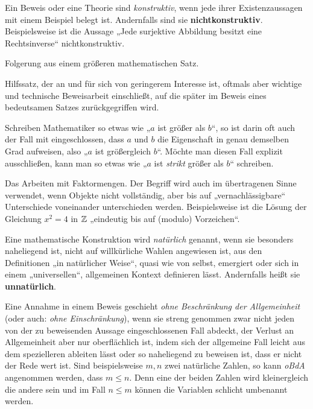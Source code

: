 \begin{description}[labelindent=0pt, leftmargin=0pt]
    \item[Konstruktiv:] Ein Beweis oder eine Theorie sind \emph{konstruktiv}, wenn jede ihrer Existenzaussagen mit einem Beispiel belegt ist. Andernfalls sind sie \textbf{nichtkonstruktiv}. Beispielsweise ist die Aussage „Jede surjektive Abbildung besitzt eine Rechtsinverse“ nichtkonstruktiv.
    
    \item[Korollar:] Folgerung aus einem größeren mathematischen Satz.

    \item[Lemma:] Hilfssatz, der an und für sich von geringerem Interesse ist, oftmals aber wichtige und technische Beweisarbeit einschließt, auf die später im Beweis eines bedeutsamen Satzes zurückgegriffen wird.

    \item[Mathematischer Komparativ:] Schreiben Mathematiker so etwas wie „$a$ ist größer als $b$“, so ist darin oft auch der Fall mit eingeschlossen, dass $a$ und $b$ die Eigenschaft in genau demselben Grad aufweisen, also „$a$ ist größergleich $b$“. Möchte man diesen Fall explizit ausschließen, kann man so etwas wie „$a$ ist \emph{strikt} größer als $b$“ schreiben.
    
    \item[Modulo:]  Das Arbeiten mit Faktormengen. Der Begriff wird auch im übertragenen Sinne verwendet, wenn Objekte nicht vollständig, aber bis auf „vernachlässigbare“ Unterschiede voneinander unterschieden werden. Beispielsweise ist die Lösung der Gleichung $x^2=4$ in $\mathbb Z$ „eindeutig bis auf (\glq modulo\grq) Vorzeichen“.

    \item[Natürlich:] Eine mathematische Konstruktion wird \emph{natürlich} genannt, wenn sie besonders naheliegend ist, nicht auf willkürliche Wahlen angewiesen ist, aus den Definitionen „in natürlicher Weise“, quasi wie von selbst, emergiert oder sich in einem „universellen“, allgemeinen Kontext definieren lässt. Andernfalls heißt sie \textbf{unnatürlich}.

    \item[Ohne Beschränkung der Allgemeinheit (OBdA):]  Eine Annahme in einem Beweis geschieht \emph{ohne Beschränkung der Allgemeinheit} (oder auch: \emph{ohne Einschränkung}), wenn sie streng genommen zwar nicht jeden von der zu beweisenden Aussage eingeschlossenen Fall abdeckt, der Verlust an Allgemeinheit aber nur oberflächlich ist, indem sich der allgemeine Fall leicht aus dem spezielleren ableiten lässt oder so naheliegend zu beweisen ist, dass er nicht der Rede wert ist. Sind beispielsweise $m,n$ zwei natürliche Zahlen, so kann \emph{oBdA} angenommen werden, dass $m\le n$. Denn eine der beiden Zahlen wird kleinergleich die andere sein und im Fall $n\le m$ können die Variablen schlicht umbenannt werden.


\end{description}
